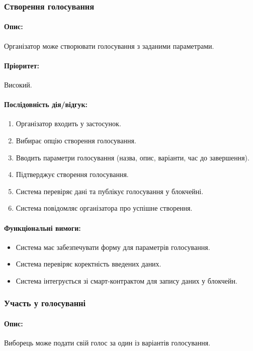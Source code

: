 \documentclass[14pt]{extreport}
\newcounter{req}[subsubsection]
\newcommand\req{\arabic{req}\stepcounter{req}}
\begin{document}
  \subsubsection{Створення голосування}  
  \paragraph{Опис:} Організатор може створювати голосування з заданими параметрами.  
  \paragraph{Пріоритет:} Високий.
  \paragraph{Послідовність дія/відгук:}  
  \begin{enumerate}  
      \item Організатор входить у застосунок.  
      \item Вибирає опцію створення голосування.  
      \item Вводить параметри голосування (назва, опис, варіанти, час до завершення).  
      \item Підтверджує створення голосування.  
      \item Система перевіряє дані та публікує голосування у блокчейні.  
      \item Система повідомляє організатора про успішне створення.  
  \end{enumerate}
  \paragraph{Функціональні вимоги:}
  \begin{itemize}[leftmargin=*,label=REQ-.\req:]  
      \item Система має забезпечувати форму для параметрів голосування.
      \item Система перевіряє коректність введених даних.
      \item Система інтегрується зі смарт-контрактом для запису даних у блокчейн.  
  \end{itemize}

  \subsubsection{Участь у голосуванні}  
  \paragraph{Опис:} Виборець може подати свій голос за один із варіантів голосування.  
\end{document}
